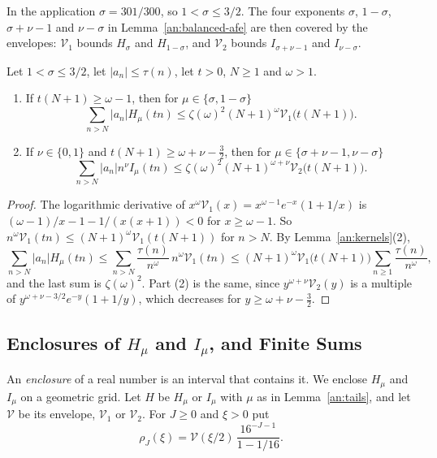 In the application $\sigma=301/300$, so $1<\sigma\le3/2$. The four exponents $\sigma$,
$1-\sigma$, $\sigma+\nu-1$ and $\nu-\sigma$ in Lemma~\ref{an:balanced-afe}
are then covered by the envelopes: $\mathcal V_1$ bounds $H_\sigma$ and
$H_{1-\sigma}$, and $\mathcal V_2$ bounds $I_{\sigma+\nu-1}$ and
$I_{\nu-\sigma}$.

\begin{lemma}\label{an:tails}
Let $1<\sigma\le3/2$, let $|a_n|\le\tau(n)$, let $t>0$, $N\ge1$ and
$\omega>1$.
\begin{enumerate}
\item If $t(N+1)\ge\omega-1$, then for $\mu\in\{\sigma,1-\sigma\}$
\[
 \sum_{n>N}|a_n|H_\mu(tn)\le\zeta(\omega)^2(N+1)^\omega
 \mathcal V_1\bigl(t(N+1)\bigr).
\]
\item If $\nu\in\{0,1\}$ and $t(N+1)\ge\omega+\nu-\frac32$, then for
 $\mu\in\{\sigma+\nu-1,\nu-\sigma\}$
\[
 \sum_{n>N}|a_n|n^\nu I_\mu(tn)\le\zeta(\omega)^2(N+1)^{\omega+\nu}
 \mathcal V_2\bigl(t(N+1)\bigr).
\]
\end{enumerate}
\end{lemma}

\begin{proof}
The logarithmic derivative of
$x^\omega\mathcal V_1(x)=x^{\omega-1}e^{-x}(1+1/x)$ is
$(\omega-1)/x-1-1/(x(x+1))<0$ for $x\ge\omega-1$. So
$n^\omega\mathcal V_1(tn)\le(N+1)^\omega\mathcal V_1(t(N+1))$ for $n>N$. By
Lemma~\ref{an:kernels}(2),
\[
 \sum_{n>N}|a_n|H_\mu(tn)\le\sum_{n>N}\frac{\tau(n)}{n^\omega}\,
 n^\omega\mathcal V_1(tn)\le(N+1)^\omega\mathcal V_1\bigl(t(N+1)\bigr)
 \sum_{n\ge1}\frac{\tau(n)}{n^\omega},
\]
and the last sum is $\zeta(\omega)^2$. Part (2) is the same, since
$y^{\omega+\nu}\mathcal V_2(y)$ is a multiple of
$y^{\omega+\nu-3/2}e^{-y}(1+1/y)$, which decreases for
$y\ge\omega+\nu-\frac32$.
\end{proof}

\subsection{\texorpdfstring{Enclosures of $H_\mu$ and $I_\mu$, and Finite Sums}{Enclosures of H and I, and Finite Sums}}
\label{an:kernel-enclosures}
An \emph{enclosure} of a real number is an interval that contains it. We
enclose $H_\mu$ and $I_\mu$ on a geometric grid. Let $H$ be $H_\mu$ or $I_\mu$
with $\mu$ as in Lemma~\ref{an:tails}, and let $\mathcal V$ be its envelope,
$\mathcal V_1$ or $\mathcal V_2$. For $J\ge0$ and $\xi>0$ put
\[
 \rho_J(\xi)=\mathcal V(\xi/2)\,\frac{16^{-J-1}}{1-1/16}.
\]


